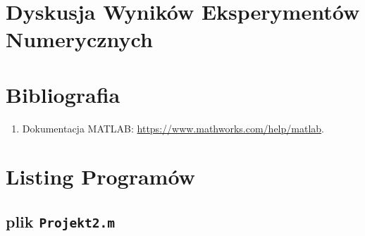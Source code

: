 \documentclass[a4paper, 12pt, twoside, openany]{article}
\begin{document}
	\newpage
	\section{Dyskusja Wyników Eksperymentów Numerycznych}
	
	\newpage
	
	\section*{Bibliografia}
	\begin{enumerate}
		\item Dokumentacja MATLAB: \url{https://www.mathworks.com/help/matlab}.
	\end{enumerate}
	
	\newpage
	
	\section*{Listing Programów}
	
	\subsection*{plik \texttt{Projekt2.m}}
	
	
\end{document}
